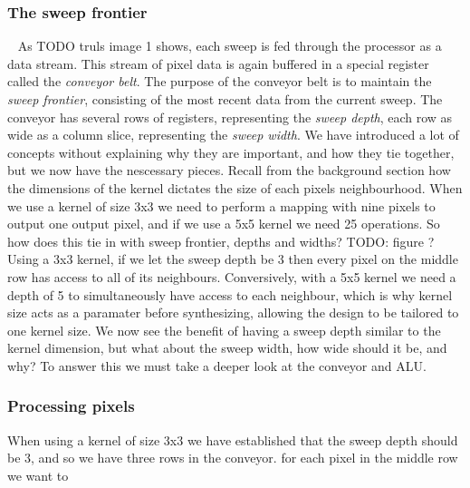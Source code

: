 \subsubsection{The sweep frontier} 
As TODO truls image 1 shows, each sweep is fed through the processor as a data stream.
This stream of pixel data is again buffered in a special register called the \textit{conveyor belt}.
The purpose of the conveyor belt is to maintain the \textit{sweep frontier}, consisting of the most recent data from the current sweep.
The conveyor has several rows of registers, representing the \textit{sweep depth}, each row as wide as a column slice, representing the \textit{sweep width}.
We have introduced a lot of concepts without explaining why they are important, and how they tie together, but we now have the nescessary pieces.
Recall from the background section how the dimensions of the kernel dictates the size of each pixels neighbourhood.  
When we use a kernel of size 3x3 we need to perform a mapping with nine pixels to output one output pixel, and if we use a 5x5 kernel we need 25 operations.
So how does this tie in with sweep frontier, depths and widths?     TODO: figure ?\\
Using a 3x3 kernel, if we let the sweep depth be 3 then every pixel on the middle row has access to all of its neighbours.
Conversively, with a 5x5 kernel we need a depth of 5 to simultaneously have access to each neighbour, which is why kernel size acts as a paramater before synthesizing, allowing the
design to be tailored to one kernel size.
We now see the benefit of having a sweep depth similar to the kernel dimension, but what about the sweep width, how wide should it be, and why?
To answer this we must take a deeper look at the conveyor and ALU.

\subsubsection{Processing pixels}
When using a kernel of size 3x3 we have established that the sweep depth should be 3, and so we have three rows in the conveyor.
for each pixel in the middle row we want to 


